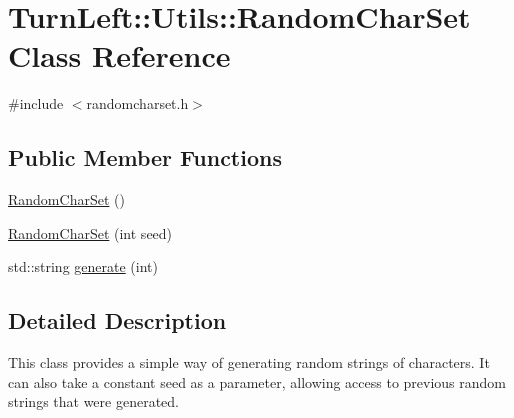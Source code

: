 \hypertarget{classTurnLeft_1_1Utils_1_1RandomCharSet}{
\section{TurnLeft::Utils::RandomCharSet Class Reference}
\label{classTurnLeft_1_1Utils_1_1RandomCharSet}
}


{\ttfamily \#include $<$randomcharset.h$>$}

\subsection*{Public Member Functions}
\begin{DoxyCompactItemize}
\item 
\hyperlink{classTurnLeft_1_1Utils_1_1RandomCharSet_a6f1627e394133bac59f72711f36a2a56}{RandomCharSet} ()
\item 
\hyperlink{classTurnLeft_1_1Utils_1_1RandomCharSet_ab5dc9b4ec2888735ff37423603db85f3}{RandomCharSet} (int seed)
\item 
std::string \hyperlink{classTurnLeft_1_1Utils_1_1RandomCharSet_a305db09f6fd847f08b0335a5334a76e5}{generate} (int)
\end{DoxyCompactItemize}


\subsection{Detailed Description}
This class provides a simple way of generating random strings of characters. It can also take a constant seed as a parameter, allowing access to previous random strings that were generated. 

